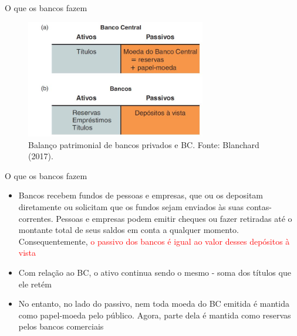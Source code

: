 \documentclass[10pt]{beamer}
\begin{document}
\begin{frame}{O que os bancos fazem}
    \begin{figure}
        \centering
        \includegraphics[width=0.7\textwidth]{./figures/aula072_fig6.JPG}
        \caption{Balanço patrimonial de bancos privados e BC. Fonte: Blanchard (2017).}
        \label{fig7}
    \end{figure}
\end{frame}

\begin{frame}{O que os bancos fazem}
    \begin{itemize}
        \item Bancos recebem fundos de pessoas e empresas, que ou os depositam diretamente ou solicitam que os fundos sejam enviados às suas contas-correntes. Pessoas e empresas podem emitir cheques ou fazer retiradas até o montante total de seus saldos em conta a qualquer momento. Consequentemente, \textcolor{red}{o passivo dos bancos é igual ao valor desses depósitos à vista}
        \bigskip
        \item Com relação ao BC, o ativo continua sendo o mesmo - soma dos títulos que ele retém
        \bigskip
        \item No entanto, no lado do passivo, nem toda moeda do BC emitida é mantida como papel-moeda pelo público. Agora, parte dela é mantida como reservas pelos bancos comerciais
    \end{itemize}
\end{frame}
\end{document}

